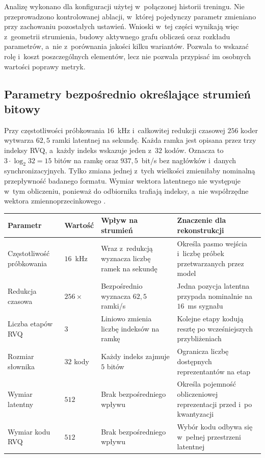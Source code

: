 Analizę wykonano dla konfiguracji użytej w~połączonej historii treningu. Nie przeprowadzono kontrolowanej ablacji, w~której pojedynczy parametr zmieniano przy zachowaniu pozostałych ustawień. Wnioski w~tej części wynikają więc z~geometrii strumienia, budowy aktywnego grafu obliczeń oraz rozkładu parametrów, a~nie z~porównania jakości kilku wariantów. Pozwala to wskazać rolę i~koszt poszczególnych elementów, lecz nie pozwala przypisać im osobnych wartości poprawy metryk.

\subsection{Parametry bezpośrednio określające strumień bitowy}
\label{subsec:parametry-strumienia-bitowego}

Przy częstotliwości próbkowania \(16\)~kHz i~całkowitej redukcji czasowej \(256\) koder wytwarza \(62{,}5\) ramki latentnej na sekundę. Każda ramka jest opisana przez trzy indeksy RVQ, a~każdy indeks wskazuje jeden z~\(32\) kodów. Oznacza to \(3\cdot\log_2 32=15\) bitów na ramkę oraz \(937{,}5\)~bit/s bez nagłówków i~danych synchronizacyjnych. Tylko zmiana jednej z~tych wielkości zmieniłaby nominalną przepływność badanego formatu. Wymiar wektora latentnego nie występuje w~tym obliczeniu, ponieważ do odbiornika trafiają indeksy, a~nie współrzędne wektora zmiennoprzecinkowego \cite{Zeghidour2021SoundStream,Defossez2022Encodec}.

\begin{center}
\centering
\small
\setlength{\tabcolsep}{4pt}
\begin{tabular}{>{\raggedright\arraybackslash}p{} >{\raggedright\arraybackslash}p{} >{\raggedright\arraybackslash}p{} >{\raggedright\arraybackslash}p{}}
\toprule
Parametr & Wartość & Wpływ na strumień & Znaczenie dla rekonstrukcji \\
\midrule
Częstotliwość próbkowania & \(16\)~kHz & Wraz z~redukcją wyznacza liczbę ramek na sekundę & Określa pasmo wejścia i~liczbę próbek przetwarzanych przez model \\
Redukcja czasowa & \(256\times\) & Bezpośrednio wyznacza \(62{,}5\) ramki/s & Jedna pozycja latentna przypada nominalnie na \(16\)~ms sygnału \\
Liczba etapów RVQ & \(3\) & Liniowo zmienia liczbę indeksów na ramkę & Kolejne etapy kodują resztę po wcześniejszych przybliżeniach \\
Rozmiar słownika & \(32\) kody & Każdy indeks zajmuje \(5\) bitów & Ogranicza liczbę dostępnych reprezentantów na etap \\
Wymiar latentny & \(512\) & Brak bezpośredniego wpływu & Określa pojemność obliczeniowej reprezentacji przed i~po kwantyzacji \\
Wymiar kodu RVQ & \(512\) & Brak bezpośredniego wpływu & Wybór kodu odbywa się w~pełnej przestrzeni latentnej \\
\bottomrule
\end{tabular}
\label{tab:parametry-modelu-przeplywnosc}
\end{center}

